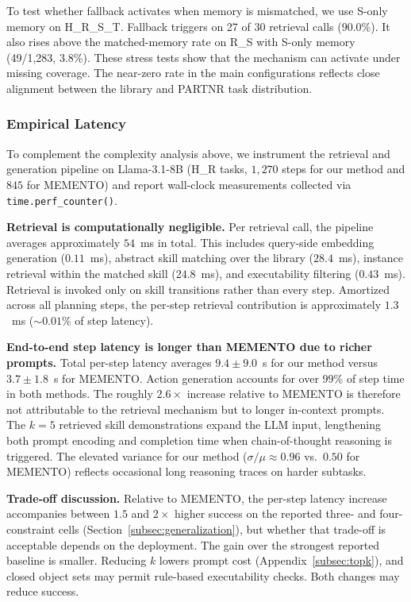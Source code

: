 \documentclass{article}
\theoremstyle{plain}
\theoremstyle{definition}
\theoremstyle{remark}
\begin{document}
To test whether fallback activates when memory is mismatched, we use S-only memory on H\_R\_S\_T. Fallback triggers on 27 of 30 retrieval calls (90.0\%). It also rises above the matched-memory rate on R\_S with S-only memory (49/1{,}283, 3.8\%). These stress tests show that the mechanism can activate under missing coverage. The near-zero rate in the main configurations reflects close alignment between the library and PARTNR task distribution.

\subsubsection{Empirical Latency}
\label{subsec:empirical_latency}

To complement the complexity analysis above, we instrument the retrieval and generation pipeline on Llama-3.1-8B (H\_R tasks, $1{,}270$ steps for our method and $845$ for MEMENTO) and report wall-clock measurements collected via \texttt{time.perf\_counter()}.

\textbf{Retrieval is computationally negligible.} Per retrieval call, the pipeline averages approximately $54$~ms in total. This includes query-side embedding generation ($0.11$~ms), abstract skill matching over the library ($28.4$~ms), instance retrieval within the matched skill ($24.8$~ms), and executability filtering ($0.43$~ms). Retrieval is invoked only on skill transitions rather than every step. Amortized across all planning steps, the per-step retrieval contribution is approximately $1.3$~ms ($\sim$$0.01\%$ of step latency).

\textbf{End-to-end step latency is longer than MEMENTO due to richer prompts.} Total per-step latency averages $9.4 \pm 9.0$~s for our method versus $3.7 \pm 1.8$~s for MEMENTO. Action generation accounts for over $99\%$ of step time in both methods. The roughly $2.6\times$ increase relative to MEMENTO is therefore not attributable to the retrieval mechanism but to longer in-context prompts. The $k=5$ retrieved skill demonstrations expand the LLM input, lengthening both prompt encoding and completion time when chain-of-thought reasoning is triggered. The elevated variance for our method ($\sigma/\mu \approx 0.96$ vs.\ $0.50$ for MEMENTO) reflects occasional long reasoning traces on harder subtasks.

\textbf{Trade-off discussion.} Relative to MEMENTO, the per-step latency increase accompanies between $1.5$ and $2\times$ higher success on the reported three- and four-constraint cells (Section~\ref{subsec:generalization}), but whether that trade-off is acceptable depends on the deployment. The gain over the strongest reported baseline is smaller. Reducing $k$ lowers prompt cost (Appendix~\ref{subsec:topk}), and closed object sets may permit rule-based executability checks. Both changes may reduce success.
\end{document}
